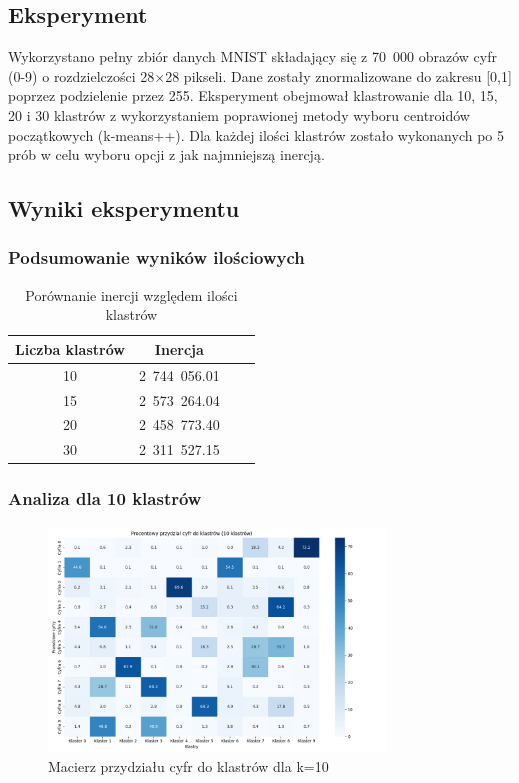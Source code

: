 \documentclass[12pt,a4paper]{article}
\begin{document}
\subsection{Eksperyment}
Wykorzystano pełny zbiór danych MNIST składający się z 70~000 obrazów cyfr (0-9) o rozdzielczości 28×28 pikseli. Dane zostały znormalizowane do zakresu [0,1] poprzez podzielenie przez 255.
Eksperyment obejmował klastrowanie dla 10, 15, 20 i 30 klastrów z wykorzystaniem poprawionej metody wyboru centroidów początkowych (k-means++).
Dla każdej ilości klastrów zostało wykonanych po 5 prób w celu wyboru opcji z jak najmniejszą inercją.

\subsection{Wyniki eksperymentu}

\subsubsection{Podsumowanie wyników ilościowych}

\begin{table}[H]
\centering
\caption{Porównanie inercji względem ilości klastrów}
\begin{tabular}{@{}cccc@{}}
\toprule
\textbf{Liczba klastrów} & \textbf{Inercja} \\
\midrule
10 & 2~744~056.01 \\
15 & 2~573~264.04 \\
20 & 2~458~773.40 \\
30 & 2~311~527.15 \\
\bottomrule
\end{tabular}
\end{table}

\subsubsection{Analiza dla 10 klastrów}

\begin{figure}[H]
\centering
\includegraphics[width=0.8\textwidth]{img/macierz10.png}
\caption{Macierz przydziału cyfr do klastrów dla k=10}
\end{figure}
\end{document}
